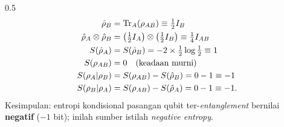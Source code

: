 \begin{frame}
\begin{columns}[T]
        \begin{column}{0.5\textwidth}
            \begin{align*}
                \hat{\rho}_B &= \operatorname{Tr}_A(\rho_{AB})
                    \equiv \tfrac{1}{2}I_B\\
                \hat{\rho}_A\otimes\hat{\rho}_B
                    &= \left(\tfrac{1}{2}I_A\right)\otimes\left(\tfrac{1}{2}I_B\right)
                     \equiv \tfrac{1}{4}I_{AB}\\
                S(\hat{\rho}_A) &= S(\hat{\rho}_B)
                    = -2\times\tfrac{1}{2}\log\tfrac{1}{2} \equiv 1\\
                S(\rho_{AB}) &= 0 \quad\text{(keadaan murni)}\\
                S(\rho_A|\rho_B) &= S(\rho_{AB})-S(\hat{\rho}_B)=0-1\equiv -1\\
                S(\rho_B|\rho_A) &= S(\rho_{AB})-S(\hat{\rho}_A)=0-1\equiv -1.
            \end{align*}
            {\tiny\justifying Kesimpulan: entropi kondisional pasangan qubit
            ter-\textit{entanglement} bernilai \textbf{negatif} ($-1$ bit);
            inilah sumber istilah \textit{negative entropy}.}
        \end{column}
    \end{columns}
\end{frame}
